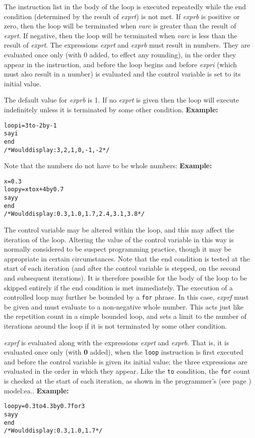 \begin{description}
The instruction list in the body of the loop is executed repeatedly
while the end condition (determined by the result of \emph{exprt})
is not met.
If \emph{exprb} is positive or zero, then the loop will be
terminated when \emph{varc} is greater than the result of
\emph{exprt}.
If negative, then the loop will be terminated when \emph{varc} is
less than the result of \emph{exprt}.
 The expressions \emph{exprt} and \emph{exprb} must result in
numbers.
They are evaluated once only (with 0 added, to effect any
rounding), in the order they appear in the instruction, and before the
loop begins and before \emph{expri} (which must also result in a
number) is evaluated and the control variable is set to its initial
value.
 
The default value for \emph{exprb} is 1.
If no \emph{exprt} is given then the loop will execute indefinitely
unless it is terminated by some other condition.
 \textbf{Example:}
\begin{alltt}
loop i=3 to -2 by -1
  say i
  end
/* Would display: 3, 2, 1, 0, -1, -2 */
\end{alltt}
Note that the numbers do not have to be whole numbers:
 \textbf{Example:}
\begin{alltt}
x=0.3
loop y=x to x+4 by 0.7
  say y
  end
/* Would display: 0.3, 1.0, 1.7, 2.4, 3.1, 3.8 */
\end{alltt}
 The control variable may be altered within the loop, and this may
affect the iteration of the loop.
Altering the value of the control variable in this way is normally
considered to be suspect programming practice, though it may be
appropriate in certain circumstances.
 Note that the end condition is tested at the start of each iteration
(and after the control variable is stepped, on the second and
subsequent iterations).  It is therefore possible for the body of the
loop to be skipped entirely if the end condition is met immediately.
 The execution of a controlled loop may further be bounded by a
\texttt{for} phrase.
In this case, \emph{exprf} must be given and must evaluate to a
non-negative whole number.
This acts just like the repetition count in a simple bounded loop, and
sets a limit to the number of iterations around the loop if it is not
terminated by some other condition.
 
\emph{exprf} is evaluated along with the expressions
\emph{exprt} and \emph{exprb}.
That is, it is evaluated once only (with \textbf{0} added), when the
\texttt{loop} instruction is first executed and before the control
variable is given its initial value; the three expressions are evaluated
in the order in which they appear.
Like the \texttt{to} condition, the \texttt{for} count is checked at the
start of each iteration, as shown in the  programmer's (see page \pageref{refloopmod}) 
model:ea..
 \textbf{Example:}
\begin{alltt}
loop y=0.3 to 4.3 by 0.7 for 3
  say y
  end
/* Would display: 0.3, 1.0, 1.7 */
\end{alltt}
 

\end{description}
